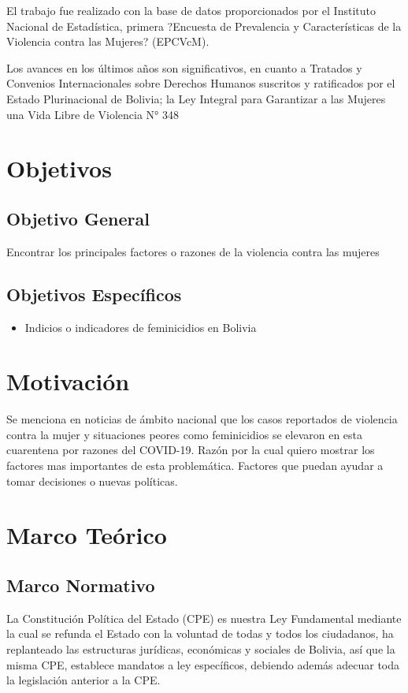 \documentclass[11pt,letter]{article}
\begin{document}
El trabajo fue realizado con la base de datos proporcionados por el Instituto Nacional de Estadística, primera ?Encuesta de Prevalencia y Características de la Violencia contra las Mujeres? (EPCVcM).

Los avances en los últimos años son significativos, en cuanto a Tratados y Convenios Internacionales sobre Derechos Humanos suscritos y ratificados por el Estado Plurinacional de Bolivia; la Ley Integral para Garantizar a las Mujeres una Vida Libre de Violencia N° 348

\section{Objetivos}

\subsection{Objetivo General}
Encontrar los principales factores o razones de la violencia contra las mujeres
\subsection{Objetivos Específicos}
\begin{itemize}
\item Indicios o indicadores de feminicidios en Bolivia 
\end{itemize}

\section{Motivación}
Se menciona en noticias de ámbito nacional que los casos reportados de violencia contra la mujer y situaciones peores como feminicidios se elevaron en esta cuarentena por razones del COVID-19. 
Razón por la cual quiero mostrar los factores mas importantes de esta problemática.
Factores que puedan ayudar a tomar decisiones o nuevas políticas.

\section{Marco Teórico}

\subsection{Marco Normativo}
La Constitución Política del Estado (CPE) es nuestra Ley Fundamental mediante la cual se refunda el Estado con la voluntad de todas y todos los ciudadanos, ha replanteado las estructuras jurídicas, económicas y sociales de Bolivia, así que la misma CPE, establece mandatos a ley
específicos, debiendo además adecuar toda la legislación
anterior a la CPE.
\end{document}
